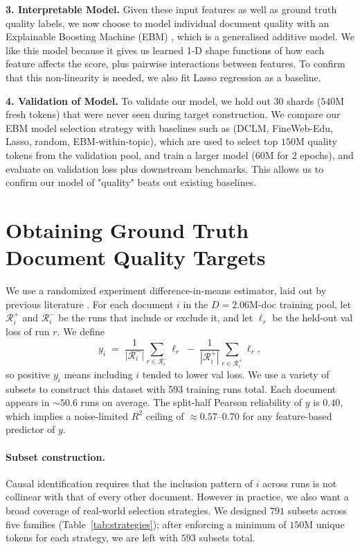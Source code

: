 \documentclass[twocolumn,letterpaper,10pt]{article}
\begin{document}
\textbf{3. Interpretable Model.} Given these input features as well as ground truth quality labels, we now choose to model individual document quality with an Explainable Boosting
Machine (EBM) \citep{lou2013ebm,nori2019interpretml}, which is a
generalised additive model. We like this model because it gives us learned 1-D shape functions of how each feature affects the score, plus
pairwise interactions between features. To confirm that this non-linearity is needed, we also fit Lasso regression as a baseline.

\textbf{4. Validation of Model.} To validate our model, we hold out $30$ shards
($540$M fresh tokens) that were never seen during target construction.
We compare our EBM model selection strategy with baselines such as (DCLM, FineWeb-Edu, Lasso,
random, EBM-within-topic), which are used to select top $150$M quality tokens from the validation pool, and train a larger model
($60$M for $2$ epochs), and evaluate on validation loss plus
downstream benchmarks. This allows us to confirm our model of "quality" beats out existing baselines.

\section{Obtaining Ground Truth Document Quality Targets}
\label{sec:target}

We use a randomized experiment difference-in-means
estimator, laid out by previous literature \citep{imbens2015causal,ilyas2022datamodels,engstrom2024dsdm}.
For each document $i$ in the $D=2.06$M-doc training pool, let
$\mathcal{R}_i^+$ and $\mathcal{R}_i^-$ be the runs that include or
exclude it, and let $\ell_r$ be the held-out val loss of run $r$. We
define
\begin{equation}
  y_i \;=\; \frac{1}{|\mathcal{R}_i^-|}\!\sum_{r\in\mathcal{R}_i^-}\!\ell_r
        \;-\; \frac{1}{|\mathcal{R}_i^+|}\!\sum_{r\in\mathcal{R}_i^+}\!\ell_r,
  \label{eq:y}
\end{equation}
so positive $y_i$ means including $i$ tended to lower val loss. We use a variety of subsets to construct this dataset with 593 training runs total. Each
document appears in $\sim 50.6$ runs on average. The split-half Pearson
reliability of $y$ is $0.40$, which implies a noise-limited $R^2$ ceiling
of $\approx 0.57$--$0.70$ for any feature-based predictor of $y$.

\paragraph{Subset construction.} Causal identification requires that
the inclusion pattern of $i$ across runs is not collinear with that
of every other document. However in practice, we also want a broad coverage of
real-world selection strategies. We designed $791$ subsets across
five families (Table~\ref{tab:strategies}); after enforcing a minimum of
$150$M unique tokens for each strategy, we are left with $593$ subsets total.
\end{document}
